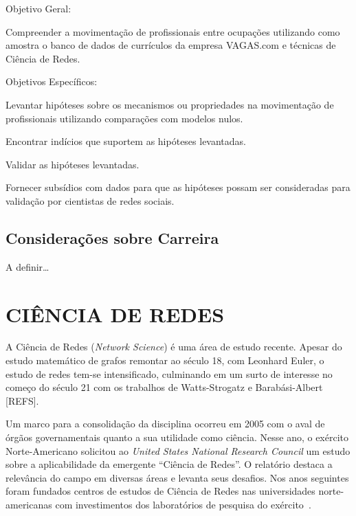 \documentclass[12pt,a4paper]{article}
\theoremstyle{hypo}
\begin{document}
    
Objetivo Geral:

Compreender a movimentação de profissionais entre ocupações utilizando como amostra o banco de dados de currículos da empresa VAGAS.com e técnicas de Ciência de Redes.

Objetivos Específicos:

Levantar hipóteses sobre os mecanismos ou propriedades na movimentação de profissionais utilizando comparações com modelos nulos.

Encontrar indícios que suportem as hipóteses levantadas.

Validar as hipóteses levantadas.

Fornecer subsídios com dados para que as hipóteses possam ser consideradas para validação por cientistas de redes sociais.


\subsection{Considerações sobre Carreira}

A definir\ldots


\section{CIÊNCIA DE REDES}

A Ciência de Redes (\textit{Network Science}) é uma área de estudo recente. Apesar do estudo matemático de grafos remontar ao século 18, com Leonhard Euler, o estudo de redes tem-se intensificado, culminando em um surto de interesse no começo do século 21 com os trabalhos de Watts-Strogatz e Barabási-Albert [{REFS}].

Um marco para a consolidação da disciplina ocorreu em 2005 com o aval de órgãos governamentais quanto a sua utilidade como ciência. Nesse ano, o exército Norte-Americano solicitou ao \textit{United States National Research Council} um estudo sobre a aplicabilidade da emergente \enquote{Ciência de Redes}. O relatório destaca a relevância do campo em diversas áreas e levanta seus desafios. Nos anos seguintes foram fundados centros de estudos de Ciência de Redes nas universidades norte-americanas com investimentos dos laboratórios de pesquisa do exército~\cite{Maxwell2009-kq}.
\end{document}
